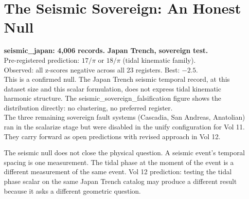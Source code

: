 \documentclass[11pt, letterpaper, openany]{book}
\begin{document}
\section{The Seismic Sovereign: An Honest Null}

\begin{nullbox}
\textbf{seismic\_japan: 4,006 records. Japan Trench, sovereign test.}\\[0.5em]
Pre-registered prediction: $17/\pi$ or $18/\pi$ (tidal kinematic family).\\
Observed: all z-scores negative across all 23 registers. Best: $-2.5$.\\[0.5em]
This is a confirmed null. The Japan Trench seismic temporal record, at
this dataset size and this scalar formulation, does not express tidal
kinematic harmonic structure. The seismic\_sovereign\_falsification figure
shows the distribution directly: no clustering, no preferred register.\\[0.5em]
The three remaining sovereign fault systems (Cascadia, San Andreas, Anatolian)
ran in the scalarize stage but were disabled in the unify configuration for
Vol 11. They carry forward as open predictions with revised approach in Vol 12.
\end{nullbox}

The seismic null does not close the physical question. A seismic event's
temporal spacing is one measurement. The tidal phase at the moment of the
event is a different measurement of the same event. Vol 12 prediction:
testing the tidal phase scalar on the same Japan Trench catalog may produce
a different result because it asks a different geometric question.

%
%
%

\end{document}
